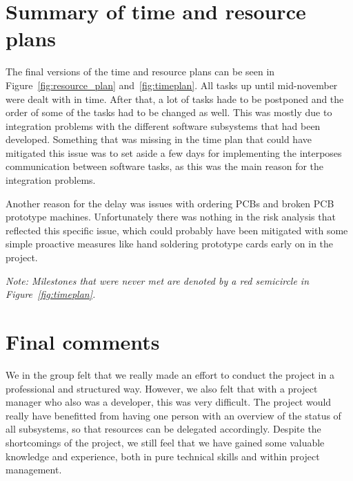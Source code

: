 \documentclass[11pt, titlepage]{article} %
\begin{document}
\section{Summary of time and resource plans}
The final versions of the time and resource plans can be seen in Figure~\ref{fig:resource_plan}
and~\ref{fig:timeplan}. All tasks up until mid-november were dealt with in time. After that,
a lot of tasks hade to be postponed and the order of some of the tasks had to be changed as well.
This was mostly due to integration problems with the different software subsystems that had
been developed. Something that was missing in the time plan that could have mitigated this issue
was to set aside a few days for implementing the interposes communication between software tasks,
as this was the main reason for the integration problems.

Another reason for the delay was issues with ordering PCBs and broken PCB
prototype machines. Unfortunately there was nothing in the risk analysis that reflected
this specific issue, which could probably have been mitigated with some simple proactive
measures like hand soldering prototype cards early on in the project.

\textit{Note: Milestones that were never met are denoted by a red semicircle in
Figure~\ref{fig:timeplan}.}

\section{Final comments}
We in the group felt that we really made an effort to conduct the project in a professional
and structured way. However, we also felt that with a project manager who also was a developer,
this was very difficult. The project would really have benefitted from having one person with an
overview of the status of all subsystems, so that resources can be delegated accordingly.
Despite the shortcomings of the project, we still feel that we have gained some valuable knowledge
and experience, both in pure technical skills and within project management.

\clearpage

\appendix
\end{document}
